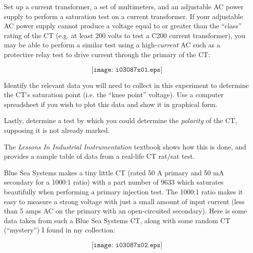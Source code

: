

Set up a current transformer, a set of multimeters, and an adjustable AC power supply to perform a saturation test on a current transformer.  If your adjustable AC power supply cannot produce a voltage equal to or greater than the ``class'' rating of the CT (e.g. at least 200 volts to test a C200 current transformer), you may be able to perform a similar test using a high-{\it current} AC such as a protective relay test to drive current through the primary of the CT:

$$\texttt{[image: i03087x01.eps]}$$

Identify the relevant data you will need to collect in this experiment to determine the CT's saturation point (i.e. the ``knee point'' voltage).  Use a computer spreadsheet if you wish to plot this data and show it in graphical form.

\vskip 10pt

Lastly, determine a test by which you could determine the {\it polarity} of the CT, supposing it is not already marked.







The {\it Lessons In Industrial Instrumentation} textbook shows how this is done, and provides a sample table of data from a real-life CT rat/sat test.







Blue Sea Systems makes a tiny little CT (rated 50 A primary and 50 mA secondary for a 1000:1 ratio) with a part number of 9633 which saturates beautifully when performing a primary injection test.  The 1000:1 ratio makes it easy to measure a strong voltage with just a small amount of input current (less than 5 amps AC on the primary with an open-circuited secondary).  Here is some data taken from such a Blue Sea Systems CT, along with some random CT (``mystery'') I found in my collection:

$$\texttt{[image: i03087x02.eps]}$$




